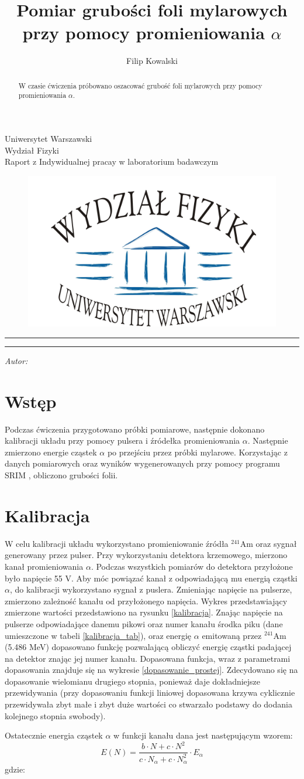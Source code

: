 \documentclass[12pt,a4paper]{article}
\author{Filip Kowalski }
\title{Pomiar grubości foli mylarowych przy pomocy promieniowania $\alpha$}
\makeatletter
\newcommand{\linia}{\rule{\linewidth}{0.4mm}}
\newcommand{\Ameryk}{${}^{241}_{}{}$Am }
\renewcommand{\maketitle}{\begin{titlepage}
    \vspace*{1cm}
    \begin{center}\small
    Uniwersytet Warszawski\\
    Wydział Fizyki\\
   Raport z Indywidualnej pracay w laboratorium badawczym
    \end{center}
    
\begin{figure}[h]
    \centering
    \includegraphics[scale=0.5]{logo.jpg}
    \end{figure}


    \vspace{3cm}
    \noindent\linia
    \begin{center}
      \LARGE \textsc{\@title}
         \end{center}
     \linia
    \vspace{0.5cm}
    \begin{flushright}
    \begin{minipage}{5cm}
    \textit{\small Autor:}\\
    \normalsize \textsc{\@author} \par
    \end{minipage}
    \vspace{5cm}
    
     \end{flushright}
    \vspace*{\stretch{6}}
    \begin{center}
    \@date
    \end{center}
         \end{titlepage}}
\makeatother
\begin{document}
\maketitle
\begin{abstract}
W czasie ćwiczenia próbowano oszacować grubość foli mylarowych przy pomocy promieniowania $\alpha$. 
\end{abstract}
\section{Wstęp}
Podczas ćwiczenia przygotowano próbki pomiarowe, następnie dokonano kalibracji układu przy pomocy pulsera i źródełka promieniowania $\alpha$. Następnie zmierzono energie cząstek $\alpha$ po przejściu przez próbki mylarowe. Korzystając z danych pomiarowych oraz wyników wygenerowanych przy pomocy programu SRIM \cite{srim}, obliczono grubości folii.

\section{Kalibracja}
W celu kalibracji układu wykorzystano promieniowanie źródła \Ameryk oraz sygnał generowany przez pulser. Przy wykorzystaniu detektora krzemowego, mierzono kanał promieniowania $\alpha$. Podczas wszystkich pomiarów do detektora przyłożone było napięcie 55 V. Aby móc powiązać kanał z odpowiadającą mu energią cząstki $\alpha$, do kalibracji wykorzystano sygnał z puslera. Zmieniając napięcie  na pulserze, zmierzono zależność kanału od przyłożonego napięcia. Wykres przedstawiający zmierzone wartości przedstawiono na rysunku \ref{kalibracja}. Znając napięcie na pulserze odpowiadające danemu pikowi oraz numer kanału środka piku (dane umieszczone w tabeli \ref{kalibracja_tab}), oraz energię $\alpha$ emitowaną przez \Ameryk  (5.486 MeV) dopasowano funkcję pozwalającą obliczyć energię cząstki padającej na detektor znając jej numer kanału. Dopasowana funkcja, wraz z parametrami dopasowania znajduje się na wykresie \ref{dopasowanie_prostej}. Zdecydowano się na dopasowanie wielomianu drugiego stopnia, ponieważ daje dokładniejsze przewidywania (przy dopasowaniu funkcji liniowej dopasowana krzywa cyklicznie przewidywała zbyt małe i zbyt duże wartości co stwarzało podstawy do dodania kolejnego stopnia swobody). 

Ostatecznie energia cząstek $\alpha$ w funkcji kanału dana jest następującym wzorem:
\[
\label{wzorenergia}
E(N)= \frac{b \cdot N+c \cdot N^2}{c \cdot  N_\alpha+c \cdot N_\alpha ^2 } \cdot E_\alpha\] 
gdzie: 
\end{document}
